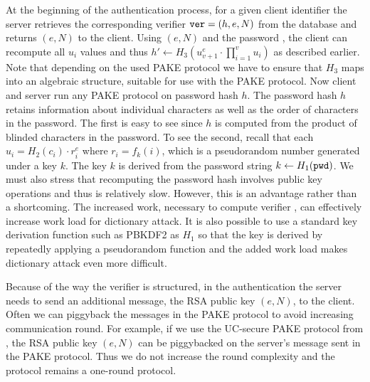 At the beginning of the authentication process, for a given client identifier the server retrieves the corresponding verifier $\mathtt{ver}=(h, e, N)$ from the database and returns $(e,N)$ to the client.
Using $(e,N)$ and the password \pwd, the client can recompute all $u_i$ values and thus $h'\gets H_3(u_{v+1}^e\cdot\prod_{i=1}^{v}u_i)$ as described earlier.
Note that depending on the used PAKE protocol we have to ensure that $H_3$ maps into an algebraic structure, suitable for use with the PAKE protocol.
Now client and server run any PAKE protocol on password hash $h$. The password hash $h$ retains information about individual characters as well as the order of characters in the password. The first is easy to see since $h$ is computed from the product of blinded characters in the password.  
To see the second, recall that each $u_i=H_2(c_i)\cdot r_i^e$ where $r_i=f_k(i)$, which is a pseudorandom number generated under a key $k$. 
The key $k$ is derived from the password string $k\gets H_1(\mathtt{pwd})$. 
We must also stress that recomputing the password hash involves public key operations and thus is relatively slow.
However, this is an advantage rather than a shortcoming. 
The increased work, necessary to compute verifier \ver, can effectively increase work load for dictionary attack. 
It is also possible to use a standard key derivation function such as PBKDF2 \cite{rfc2898} as $H_1$ so that the key is derived by repeatedly applying a pseudorandom function and the added work load makes dictionary attack even more difficult.

Because of the way the verifier is structured, in the authentication the server needs to send an additional message, the RSA public key $(e,N)$, to the client. Often we can piggyback the messages in the PAKE protocol to avoid increasing communication round. 
For example, if we use the UC-secure PAKE protocol from \citet{Benhamouda2013}, the RSA public key $(e,N)$ can be piggybacked on the server's message sent in the PAKE protocol. Thus we do not increase the round complexity and the protocol remains a one-round protocol.

